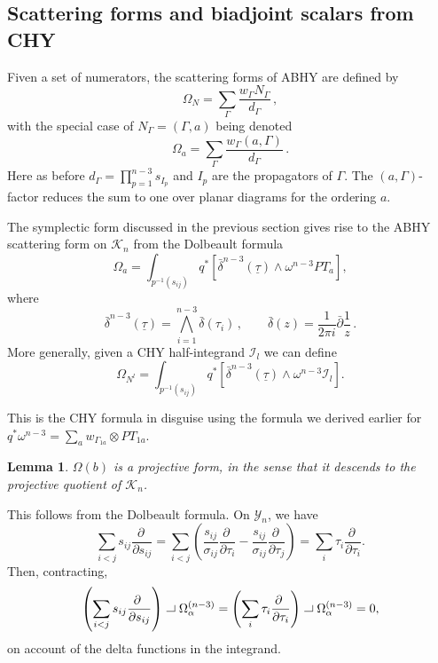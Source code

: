 \documentclass[11pt]{article}
\newcommand{\p}{\partial}
\newcommand{\cK}{\mathcal{K}}
\newcommand{\cI}{\mathcal{I}}
\newcommand{\cY}{\mathcal{Y}}
\newcommand{\bt}{\underline{\tau}}
\newcommand{\1}{{\rm 1\hskip-0.25em I}}
\newcommand{\proof}{ \noindent {\bf Proof:} }
\newtheorem{lemma}{Lemma}[section]
\newcommand{\hook}{{\setlength{\unitlength}{10pt}		%
                  ~ \begin{picture}(.833,.8)
                   \put(-.18,.08){\line(1,0){.7}}
                   \put(.5,.08){\line(0,1){.5}}
                   \end{picture}}}
\begin{document}
 



\subsection{Scattering forms and  biadjoint scalars from CHY}


Fiven a set of numerators, the scattering forms of ABHY are defined by 
\begin{equation}
\Omega_N=\sum_{\Gamma}\frac{w_\Gamma  N_\Gamma}{d_\Gamma} \, ,
\end{equation}
with the special case of $N_\Gamma=(\Gamma,a)$ being denoted
\begin{equation}
\Omega_a=\sum_{\Gamma}\frac{w_\Gamma  (a,\Gamma)}{d_\Gamma} \, .
\end{equation}
Here as before $d_\Gamma=\prod_{p=1}^{n-3} s_{I_p}$ and  $I_p$ are the propagators of $\Gamma$. The $(a,\Gamma)$-factor reduces the sum to one  over planar diagrams for the ordering $a$.



The symplectic form discussed in the previous section gives rise to the ABHY scattering form on $\cK_n$ from the Dolbeault formula 
\begin{equation}
\Omega_a = \int_{p^{-1}(s_{ij})} q^* \left[ \bar\delta^{n-3}(\bt) \wedge \omega^{n-3} PT_a \right],
\end{equation}
where 
\begin{equation}
\bar\delta^{n-3}(\bt)=\bigwedge_{i=1}^{n-3} \bar\delta(\tau_i)\, , \qquad \bar \delta(z)=\frac{1}{2\pi i} \bar\p\frac{1}{z}\, .
\end{equation} 
More generally, given a CHY half-integrand $\cI_l$ we can define 
\begin{equation}
\Omega_{N^l} = \int_{p^{-1}(s_{ij})} q^* \left[ \bar\delta^{n-3}(\bt) \wedge \omega^{n-3} \cI_l\right].
\end{equation}


This is the CHY formula in disguise using the formula we derived earlier for $q^*\omega^{n-3}=\sum_a w_{\Gamma_{1a}}\otimes PT_{1a}$.

\begin{lemma}
 $\Omega(b)$ is a projective form, in the sense that it descends to the projective quotient of $\cK_n$.
 \end{lemma}
 \proof This follows from the Dolbeault formula. On $\cY_n$, we have
$$
\sum_{i<j}s_{ij}\frac{\p~}{\p s_{ij}} = \sum_{i<j} \left(\frac{s_{ij}}{\sigma_{ij}}\frac{\p~}{\p\tau_i} - \frac{s_{ij}}{\sigma_{ij}}\frac{\p~}{\p\tau_j}\right) = \sum_i \tau_i \frac{\p~}{\p\tau_i}.
$$
Then, contracting,
$$
\left(\sum_{i<j}s_{ij}\frac{\p~}{\p s_{ij}}\right)\hook \Omega_{\alpha}^{(n-3)} = \left(\sum_i \tau_i \frac{\p~}{\p\tau_i}\right)\hook \Omega_{\alpha}^{(n-3)} = 0,
$$
on account of the delta functions in the integrand.
\end{document}
